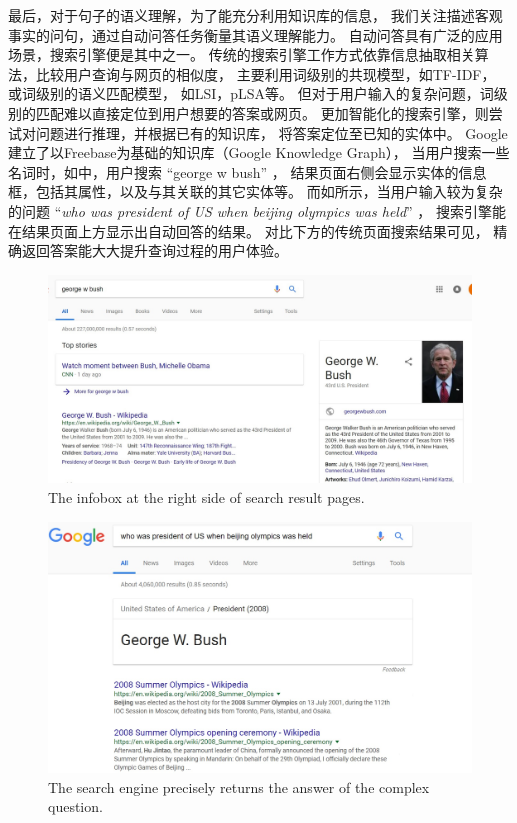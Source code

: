 最后，对于句子的语义理解，为了能充分利用知识库的信息，
我们关注描述客观事实的问句，通过自动问答任务衡量其语义理解能力。
自动问答具有广泛的应用场景，搜索引擎便是其中之一。
传统的搜索引擎工作方式依靠信息抽取相关算法，比较用户查询与网页的相似度，
主要利用词级别的共现模型，如TF-IDF\cite{leskovec2014mining}，
或词级别的语义匹配模型，
如LSI\cite{deerwester1990indexing}，pLSA\cite{hofmann1999probabilistic}等。
但对于用户输入的复杂问题，词级别的匹配难以直接定位到用户想要的答案或网页。
更加智能化的搜索引擎，则尝试对问题进行推理，并根据已有的知识库，
将答案定位至已知的实体中。
Google建立了以Freebase为基础的知识库（Google Knowledge Graph），
当用户搜索一些名词时，如中，用户搜索 ``george w bush'' ，
结果页面右侧会显示实体的信息框，包括其属性，以及与其关联的其它实体等。
而如所示，当用户输入较为复杂的问题
``\textit{who was president of US when beijing olympics was held}'' ，
搜索引擎能在结果页面上方显示出自动回答的结果。
对比下方的传统页面搜索结果可见，
精确返回答案能大大提升查询过程的用户体验。

\begin{figure}[th]
\centering
\includegraphics[width=0.9\columnwidth]{figure/intro/3_sidebar.jpg}
{The infobox at the right side of search result pages.}
\label{fig:intro-se}
\end{figure}

\begin{figure}[th]
\centering
\includegraphics[width=0.9\columnwidth]{figure/intro/3_search.jpg}
{The search engine precisely returns the answer of the complex question.}
\label{fig:intro-qa}
\end{figure}



